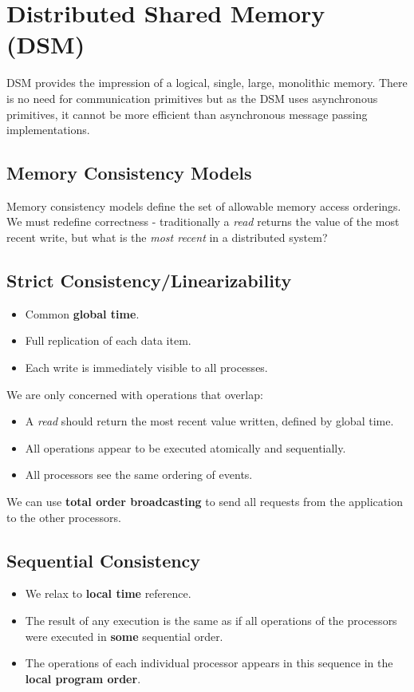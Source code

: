 \documentclass[11pt]{article}
\begin{document}
\section{Distributed Shared Memory (DSM)}
DSM provides the impression of a logical, single, large, monolithic memory.
There is no need for communication primitives but as the DSM uses asynchronous primitives, it cannot be more efficient than asynchronous message passing implementations.

\subsection{Memory Consistency Models}
Memory consistency models define the set of allowable memory access orderings.
We must redefine correctness - traditionally a \textit{read} returns the value of the most recent write, but what is the \textit{most recent} in a distributed system?

\subsection{Strict Consistency/Linearizability}
\begin{itemize}
  \item Common \textbf{global time}.
  \item Full replication of each data item.
  \item Each write is immediately visible to all processes.
\end{itemize}

We are only concerned with operations that overlap:
\begin{itemize}
  \item A \textit{read} should return the most recent value written, defined by global time.
  \item All operations appear to be executed atomically and sequentially.
  \item All processors see the same ordering of events.
\end{itemize}

We can use \textbf{total order broadcasting} to send all requests from the application to the other processors.

\subsection{Sequential Consistency}
\begin{itemize}
  \item We relax to \textbf{local time} reference.
  \item The result of any execution is the same as if all operations of the processors were executed in \textbf{some} sequential order.
  \item The operations of each individual processor appears in this sequence in the \textbf{local program order}.
\end{itemize}
\end{document}
